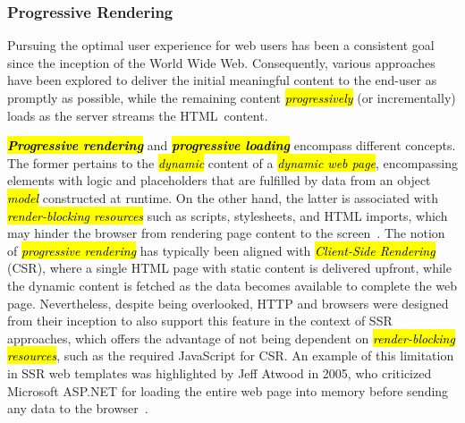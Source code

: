 \documentclass[software,article,accept,pdftex,moreauthors]{Definitions/mdpi}
\begin{document}
\subsubsection{Progressive Rendering}\label{s2.1.5}

Pursuing the optimal user experience for web users has been a consistent goal
since the inception of the World Wide Web. Consequently, various approaches
have been explored to deliver the initial meaningful content to the end-user as
promptly as possible, while the remaining content \textit{\hl{progressively}} (or
incrementally) loads as the server streams the HTML~content.

\textit{\textbf{\hl{Progressive rendering}}} and \textit{\textbf{\hl{progressive loading}}}
encompass different concepts. The former pertains to the \textit{\hl{dynamic}} content of a
\textit{\hl{dynamic web page}}, encompassing elements with logic and placeholders
that are fulfilled by data from an object \textit{\hl{model}} constructed at runtime.
On the other hand, the latter is associated with \textit{\hl{render-blocking
  resources}} such as scripts, stylesheets, and HTML imports, which may hinder the
browser from rendering page content to the screen~\cite{progressive-2022}.
The notion of \textit{\hl{progressive rendering}} has typically been aligned with
\textit{\hl{Client-Side Rendering}} (CSR), where a single HTML page with static
content is delivered upfront, while the dynamic content is fetched as the data
becomes available to complete the web page.
Nevertheless, despite being overlooked, HTTP and browsers were designed from their
inception to also support this feature in the context of SSR approaches,
which offers the advantage of not being dependent on
\textit{\hl{render-blocking resources}}, such as the required JavaScript for CSR.
An example of this limitation in SSR web templates was highlighted by Jeff
Atwood in 2005, who criticized Microsoft ASP.NET for loading the entire web
page into memory before sending any data to the browser~\cite{pssr2005}.
\end{document}

